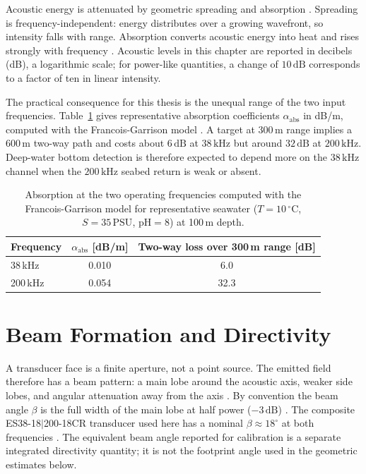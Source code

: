 Acoustic energy is attenuated by geometric spreading and absorption \cite{acoustics_unpacked_sonar_equation}. Spreading is frequency-independent: energy distributes over a growing wavefront, so intensity falls with range. Absorption converts acoustic energy into heat and rises strongly with frequency \cite{francois_sound_1982b}. Acoustic levels in this chapter are reported in decibels (dB), a logarithmic scale; for power-like quantities, a change of $10\,\text{dB}$ corresponds to a factor of ten in linear intensity.

The practical consequence for this thesis is the unequal range of the two input frequencies. Table~\ref{tab:absorption} gives representative absorption coefficients $\alpha_{\mathrm{abs}}$ in dB/m, computed with the Francois-Garrison model \cite{francois_sound_1982a,francois_sound_1982b,npl_sea_absorption_2006}. A target at 300\,m range implies a 600\,m two-way path and costs about $6\,\text{dB}$ at $38\,\text{kHz}$ but around $32\,\text{dB}$ at $200\,\text{kHz}$. Deep-water bottom detection is therefore expected to depend more on the $38\,\text{kHz}$ channel when the $200\,\text{kHz}$ seabed return is weak or absent.

\begin{table}[htbp]
\centering
\caption{Absorption at the two operating frequencies computed with the Francois-Garrison model for representative seawater ($T=10\,^\circ\text{C}$, $S=35\,\text{PSU}$, $\text{pH}=8$) at 100\,m depth.}
\label{tab:absorption}
\begin{tabular}{lcc}
\toprule
Frequency & $\alpha_{\mathrm{abs}}$ [dB/m] & Two-way loss over 300\,m range [dB] \\
\midrule
38\,kHz & 0.010 & 6.0 \\
200\,kHz & 0.054 & 32.3 \\
\bottomrule
\end{tabular}
\end{table}

\section{Beam Formation and Directivity}
\label{sec:beam_formation}

A transducer face is a finite aperture, not a point source. The emitted field therefore has a beam pattern: a main lobe around the acoustic axis, weaker side lobes, and angular attenuation away from the axis \cite{acoustics_unpacked_transducers}. By convention the beam angle $\beta$ is the full width of the main lobe at half power ($-3\,\text{dB}$) \cite{demer_calibration_2015,acoustics_unpacked_transducers}. The composite ES38-18$|$200-18CR transducer used here has a nominal $\beta \approx 18^\circ$ at both frequencies \cite{kongsberg_es38_18_200_18cr}. The equivalent beam angle reported for calibration is a separate integrated directivity quantity; it is not the footprint angle used in the geometric estimates below.

